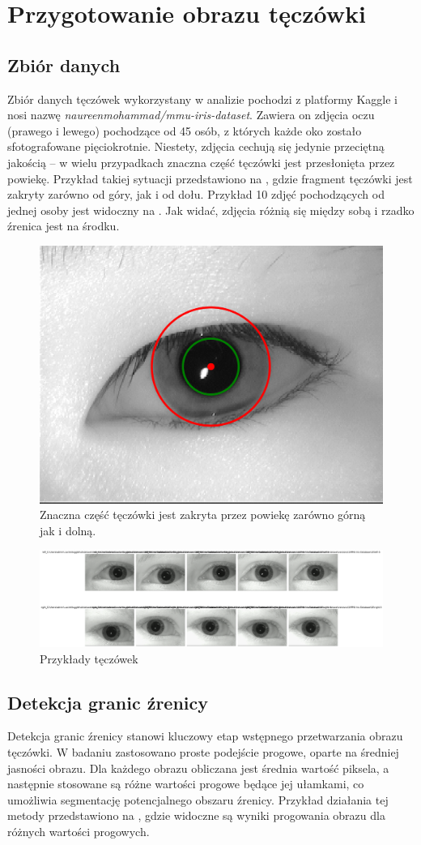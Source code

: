 \documentclass[a4paper]{article}
\begin{document}
\clearpage

\section{Przygotowanie obrazu tęczówki}

\subsection{Zbiór danych}
Zbiór danych tęczówek wykorzystany w analizie pochodzi z platformy Kaggle i nosi nazwę \emph{naureenmohammad/mmu-iris-dataset}. Zawiera on zdjęcia oczu (prawego i lewego) pochodzące od 45 osób, z których każde oko zostało sfotografowane pięciokrotnie. Niestety, zdjęcia cechują się jedynie przeciętną jakością – w wielu przypadkach znaczna część tęczówki jest przesłonięta przez powiekę. Przykład takiej sytuacji przedstawiono na , gdzie fragment tęczówki jest zakryty zarówno od góry, jak i od dołu. Przykład 10 zdjęć pochodzących od jednej osoby jest widoczny na . Jak widać, zdjęcia różnią się między sobą i rzadko źrenica jest na środku.

\begin{figure}[H]
    \centering
    \includegraphics[width=0.3\linewidth]{figures/zdj_zakryte_powieka.png}
    \caption{Znaczna część tęczówki jest zakryta przez powiekę zarówno górną jak i dolną.}
    \label{fig:powieka_zakrywa_teczowke}
\end{figure}

\begin{figure}[H]
    \centering
    \includegraphics[width=0.75\linewidth]{figures/przyklady teczowek.png}
    \caption{Przykłady tęczówek}
    \label{fig:przyklady-teczowek}
\end{figure}

\subsection{Detekcja granic źrenicy}
Detekcja granic źrenicy stanowi kluczowy etap wstępnego przetwarzania obrazu tęczówki. W badaniu zastosowano proste podejście progowe, oparte na średniej jasności obrazu. Dla każdego obrazu obliczana jest średnia wartość piksela, a następnie stosowane są różne wartości progowe będące jej ułamkami, co umożliwia segmentację potencjalnego obszaru źrenicy. Przykład działania tej metody przedstawiono na , gdzie widoczne są wyniki progowania obrazu dla różnych wartości progowych.
\end{document}
